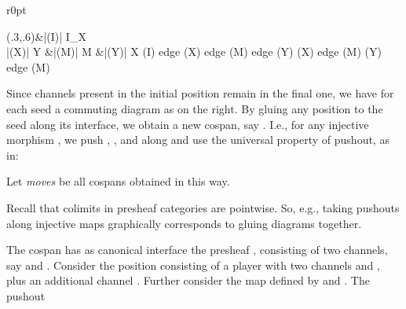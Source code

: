 \documentclass{LMCS}
\theoremstyle{plain}\newtheorem{satz}[thm]{Satz}
\begin{document}
\begin{wrapfigure}[3]{r}{0pt}
  \begin{minipage}[c][3em]{0.22\linewidth}
  \vspace*{-2em}
        \diag(.3,.6){\&|(I)| I_X \\
   |(X)| Y \&|(M)| M \&|(Y)| X }{(I) edge (X) edge (M) edge (Y) (X) edge (M) (Y) edge (M) }
  \end{minipage}
\end{wrapfigure}
Since channels present in the initial position remain in the final
one, we have for each seed a commuting diagram as on the right.  By gluing any
position  to the seed along its interface, we obtain a new cospan,
say .  I.e., for any injective morphism , we push
, , and  along  and use
the universal property of pushout, as in:
  
  \begin{defi}
    Let \emph{moves} be all cospans obtained in this way.
  \end{defi}
  Recall that colimits in presheaf categories are pointwise. So, e.g.,
  taking pushouts along injective maps graphically corresponds to
  gluing diagrams together. 
  \begin{exa}\label{ex:forkmove}
    The cospan  has
    as canonical interface the presheaf ,
    consisting of two channels, say  and .  Consider the
    position  consisting of a player  with two
    channels  and , plus an additional channel . Further
    consider the map  defined by  and . The pushout
\end{exa}
\end{document}

